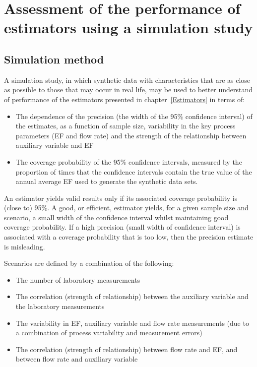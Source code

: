 \clearpage
\section{Assessment of the performance of estimators using a simulation study}\label{Simulation}

\subsection{Simulation method}
A simulation study, in which synthetic data with characteristics that are as close as possible to those that may occur in real life, may be used to better understand of  performance of the estimators presented in chapter~\ref{Estimators} in terms of:
\begin{itemize}
	\item The dependence of the precision (the width of the 95\% confidence interval) of the estimates, as a function of sample size, variability in the key process parameters (EF and flow rate) and the strength of the relationship between auxiliary variable and EF
	\item The coverage probability of the 95\% confidence intervals, measured by the proportion of times that the confidence intervals contain the true value of the annual average EF used to generate the synthetic data sets. 
\end{itemize}

An estimator yields valid results only if its associated coverage probability is (close to) 95\%. A good, or efficient, estimator yields, for a given sample size and scenario, a small width of the confidence interval whilst maintaining good coverage probability. If a high precision (small width of confidence interval) is associated with a coverage probability that is too low, then the precision estimate is misleading.

Scenarios are defined by a combination of the following:
\begin{itemize}
	\item The number of laboratory measurements
	\item The correlation (strength of relationship) between the auxiliary variable and the laboratory measurements
	\item The variability in EF, auxiliary variable and flow rate measurements (due to a combination of process variability and measurement errors)
	\item The correlation (strength of relationship) between flow rate and EF, and between flow rate and auxiliary variable
\end{itemize} 

